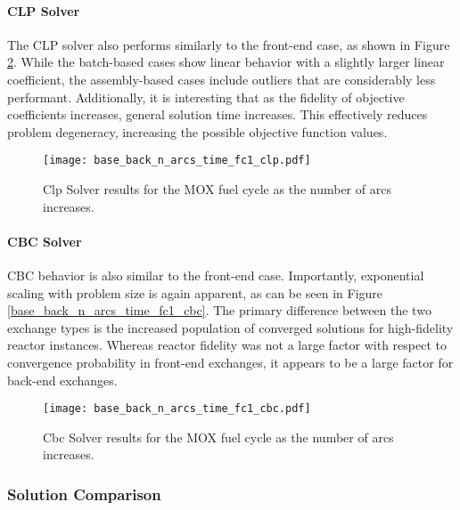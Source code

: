 \paragraph{CLP Solver}

The CLP solver also performs similarly to the front-end case, as shown in Figure
\ref{fig:base_back_n_arcs_time_fc1_clp}. While the batch-based cases show linear
behavior with a slightly larger linear coefficient, the assembly-based cases
include outliers that are considerably less performant. Additionally, it is
interesting that as the fidelity of objective coefficients increases, general
solution time increases. This effectively reduces problem degeneracy, increasing
the possible objective function values.

\begin{figure}[h!]
  \begin{center}
    \texttt{[image: base\_back\_n\_arcs\_time\_fc1\_clp.pdf]}
    \caption{
      \label{fig:base_back_n_arcs_time_fc1_clp}
      Clp Solver results for the MOX fuel cycle as the number of arcs
      increases.      
    }
  \end{center}
\end{figure}

\paragraph{CBC Solver}

CBC behavior is also similar to the front-end case. Importantly, exponential
scaling with problem size is again apparent, as can be seen in Figure
\ref{base_back_n_arcs_time_fc1_cbc}. The primary difference between the two
exchange types is the increased population of converged solutions for
high-fidelity reactor instances. Whereas reactor fidelity was not a large factor
with respect to convergence probability in front-end exchanges, it appears to be
a large factor for back-end exchanges.
 
\begin{figure}[h!]
  \begin{center}
    \texttt{[image: base\_back\_n\_arcs\_time\_fc1\_cbc.pdf]}
    \caption{
      \label{fig:base_back_n_arcs_time_fc1_clp}
      Cbc Solver results for the MOX fuel cycle as the number of arcs
      increases.      
    }
  \end{center}
\end{figure}

\subsubsection{Solution Comparison}\label{sec:res:scale:front:soln}

